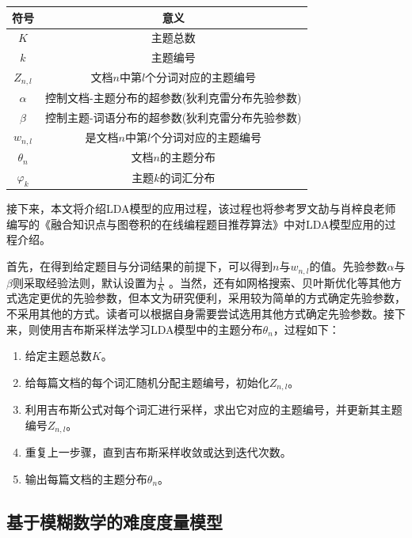 \begin{table}[htbp]
    \centering
    \begin{tabular}{@{}cc@{}}
    \toprule
    符号            & 意义                        \\ \midrule
    $K$           & 主题总数                      \\
    $k$           & 主题编号                      \\
    $Z_{n,l}$     & 文档$n$中第$l$个分词对应的主题编号      \\
    $\alpha$      & 控制文档-主题分布的超参数(狄利克雷分布先验参数) \\
    $\beta$       & 控制主题-词语分布的超参数(狄利克雷分布先验参数) \\
    $w_{n,l}$     & 是文档$n$中第$l$个分词对应的主题编号     \\
    $\theta _{n}$ & 文档$n$的主题分布                \\
    $\varphi_{k}$ & 主题$k$的词汇分布                \\ \bottomrule
    \end{tabular}
\end{table}

接下来，本文将介绍LDA模型的应用过程，该过程也将参考罗文劼与肖梓良老师编写的《融合知识点与图卷积的在线编程题目推荐算法》\cite{LuoRongHeZhiShiDianYuTuJuanJiDeZaiXianBianChengTiMuTuiJianSuanFa}中对LDA模型应用的过程介绍。

首先，在得到给定题目与分词结果的前提下，可以得到$n$与$w_{n,l}$的值。先验参数$\alpha$与$\beta$则采取经验法则，默认设置为$\frac{1}{K}$ 。当然，还有如网格搜索、贝叶斯优化等其他方式选定更优的先验参数，但本文为研究便利，采用较为简单的方式确定先验参数，不采用其他的方式。读者可以根据自身需要尝试选用其他方式确定先验参数。接下来，则使用吉布斯采样法学习LDA模型中的主题分布$\theta _{n}$，过程如下：

\begin{enumerate}
    \item 给定主题总数$K$。
    \item 给每篇文档的每个词汇随机分配主题编号，初始化$Z_{n,l}$。
    \item 利用吉布斯公式对每个词汇进行采样，求出它对应的主题编号，并更新其主题编号$Z_{n,l}$。
    \item 重复上一步骤，直到吉布斯采样收敛或达到迭代次数。
    \item 输出每篇文档的主题分布$\theta _{n}$。
\end{enumerate}

\subsection{基于模糊数学的难度度量模型}

